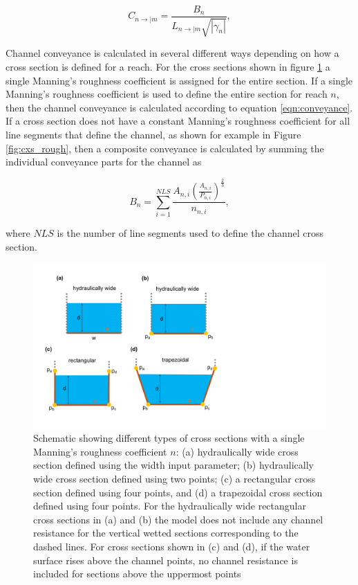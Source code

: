 \documentclass[fleqn]{article}
\begin{document}
\begin{equation}
  C_{n \rightarrow | m} = 
  \frac{
  B_n 
  }
  {
  L_{n \rightarrow | m}
  \sqrt{| \gamma_n |}
  },
\label{eqn:cn2}
\end{equation}

Channel conveyance is calculated in several different ways depending on how a cross section is defined for a reach.  For the cross sections shown in figure \ref{fig:cxs} a single Manning's roughness coefficient is assigned for the entire section.  If a single Manning's roughness coefficient is used to define the entire section for reach $n$, then the channel conveyance is calculated according to equation \ref{eqn:conveyance}.  If a cross section does not have a constant Manning's roughness coefficient for all line segments that define the channel, as shown for example in Figure \ref{fig:cxs_rough}, then a composite conveyance is calculated by summing the individual conveyance parts for the channel as

\begin{equation}
  B_n = \sum_{i=1}^{NLS} \frac{A_{n,i} \left ( \frac {A_{n,i}}{P_{n,i}}\right )^{\frac{2}{3}}}{n_{n,i}},
\end{equation}

\noindent where $NLS$ is the number of line segments used to define the channel cross section.

\begin{figure}[h!tbp]
	\centering
	\includegraphics[scale=0.5]{figures/cxs.pdf}
	\caption[Schematic showing different types of channel cross sections with constant roughness.]{Schematic showing different types of cross sections with a single Manning's roughness coefficient $n$: (a) hydraulically wide cross section defined using the width input parameter; (b) hydraulically wide cross section defined using two points; (c) a rectangular cross section defined using four points, and (d) a trapezoidal cross section defined using four points.  For the hydraulically wide rectangular cross sections in (a) and (b) the model does not include any channel resistance for the vertical wetted sections corresponding to the dashed lines.  For cross sections shown in (c) and (d), if the water surface rises above the channel points, no channel resistance is included for sections above the uppermost points}
	\label{fig:cxs}
\end{figure}
\end{document}
